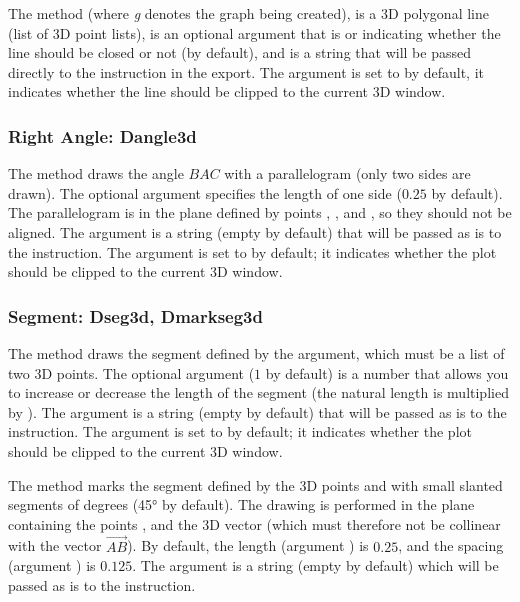 The method  (where \emph{g} denotes the graph being created),  is a 3D polygonal line (list of 3D point lists),  is an optional argument that is \true or \false indicating whether the line should be closed or not (\false by default), and  is a string that will be passed directly to the \drawcmd instruction in the export. The  argument is set to \false by default, it indicates whether the line  should be clipped to the current 3D window.

\subsubsection{Right Angle: Dangle3d}

The  method draws the angle \(BAC\) with a parallelogram (only two sides are drawn). The optional argument  specifies the length of one side ($0.25$ by default). The parallelogram is in the plane defined by points , , and , so they should not be aligned. The  argument is a string (empty by default) that will be passed as is to the \drawcmd instruction. The  argument is set to \false by default; it indicates whether the plot should be clipped to the current 3D window.

\subsubsection{Segment: Dseg3d, Dmarkseg3d}

The  method draws the segment defined by the  argument, which must be a list of two 3D points. The optional  argument ($1$ by default) is a number that allows you to increase or decrease the length of the segment (the natural length is multiplied by ). The  argument is a string (empty by default) that will be passed as is to the \drawcmd instruction. The  argument is set to \false by default; it indicates whether the plot should be clipped to the current 3D window.

The method  marks the segment defined by the 3D points  and  with  small slanted segments of  degrees (45° by default). The drawing is performed in the plane containing the points ,  and the 3D vector  (which must therefore not be collinear with the vector $\vec{AB}$). By default, the length (argument ) is $0.25$, and the spacing (argument ) is $0.125$. The argument  is a string (empty by default) which will be passed as is to the \drawcmd instruction.

